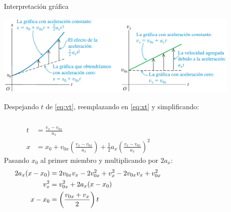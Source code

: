 \documentclass[9pt, aspectratio=169]{beamer}
\begin{document}
\begin{frame}{Interpretación gráfica}
\begin{center}
    \includegraphics[width=0.9\textwidth]{figs/mrua-4.png}
\end{center}
\pause

{\small
Despejando $t$ de \eqref{eq:vt}, reemplazando en \eqref{eq:xt} y simplificando:
\begin{columns}[t]
\begin{align*}
    t &= \frac{v_x - v_{0x}}{a_x} \\
    x &= x_0 + v_{0x} \left(\frac{v_x - v_{0x}}{a_x}\right) + \tfrac{1}{2} a_x \left(\frac{v_x - v_{0x}}{a_x}\right)^2
\end{align*}
Pasando $x_0$ al primer miembro y multiplicando por $2 a_x$:
\begin{align}
    2 a_x(x - x_0) &= 2 v_{0x} v_x - 2 v_{0x}^2 + v_x^2 -2 v_{0x} v_x + v_{0x}^2 \notag \\
    v_x^2 &= v_{0x}^2 + 2 a_x (x - x_0) \\
x-x_0 &= \left(\frac{v_{0x} + v_x}{2} \right) t
\end{align}
\end{columns}
}
\end{frame}
\end{document}
